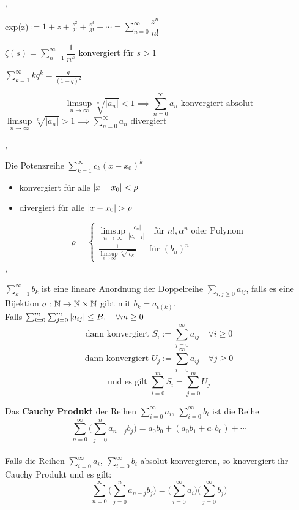 \sep

\Bsp exp(z)$ := 1 + z + \frac{z^2}{2!} + \frac{z^3}{3!} + \cdots = \sum_{n=0}^{\infty} \dfrac{z^{n}}{n!}$

\Bsp $\zeta(s) =  \sum_{n=1}^{\infty} \dfrac{1}{n^s}$ konvergiert für $s > 1$

\Bsp $\sum_{k=1}^{\infty} k q^k = \frac{q}{(1- q)^2}$ 

\Satz[Wurzelkriterium] 
\[\limsup\limits_{n \rightarrow \infty} \sqrt[n]{\left|a_{n}\right|}<1 \implies \sum_{n=0}^{\infty} a_{n} \text{ konvergiert absolut} \]
\(\limsup\limits_{n \rightarrow \infty} \sqrt[n]{\left|a_{n}\right|}>1 \implies \sum_{n=0}^{\infty} a_{n} \text{ divergiert}\)

\sep

\Korollar[2.7.21] Die Potenzreihe $\sum_{k=1}^{\infty} c_{k} (x-x_0)^k$
\begin{itemize}
\item konvergiert für alle $\left\lvert x - x_0 \right\rvert < \rho$ 
\item divergiert für alle $\left\lvert x - x_0 \right\rvert > \rho$
\end{itemize}
\[\rho = \begin{cases}
\limsup\limits_{n \rightarrow \infty} \frac{\left|c_{n}\right|}{\left|c_{n + 1}\right|} \quad \text{für } n!, \alpha^n \text{ oder Polynom} \\
\frac{1}{\limsup\limits_{c \rightarrow \infty} \sqrt[k]{\left|c_{k}\right|}}  \quad \  \ \text{für } (b_n)^n
\end{cases}\]
\sep

\Def[2.7.22] $\sum_{k=1}^{\infty} b_{k}$ ist eine lineare Anordnung der Doppelreihe $\sum_{i,j \geq 0} a_{ij}$, falls es eine Bijektion $\sigma : \mathbb{N} \rightarrow \mathbb{N} \times \mathbb{N}$ gibt mit $b_k = a_{\epsilon(k)}$.  \\

\Satz[2.7.23] Falls $\sum_{i=0}^{m}\sum_{j=0}^{m}\left\lvert a_{ij} \right\rvert \leq B, \quad \forall m \geq 0$
\[ \text{dann konvergiert } S_{i} := \sum_{j=0}^{\infty} a_{ij} \quad \forall i \geq 0 \]
\[ \text{dann konvergiert } U_{j} := \sum_{i=0}^{\infty} a_{ij} \quad \forall j \geq 0 \]
\[ \text{und es gilt } \sum_{i=0}^{m} S_{i} = \sum_{j=0}^{m} U_{j} \] 

\Satz[2.7.24] Das \textbf{Cauchy Produkt} der Reihen $\sum_{i=0}^{\infty} a_i, \ \sum_{i=0}^{\infty} b_i$ ist die Reihe
\[\sum_{n=0}^\infty \Bigg(\sum_{j=0}^{n} a_{n-j} b_{j} \Bigg) = a_0 b_0 + (a_0 b_1 + a_1 b_0) + \cdots  \]  \\

\Satz[2.7.26] Falls die Reihen $\sum_{i=0}^{\infty} a_i, \ \sum_{i=0}^{\infty} b_i$ absolut konvergieren, so knovergiert ihr Cauchy Produkt und es gilt:
\[\sum_{n=0}^\infty \Bigg(\sum_{j=0}^{n} a_{n-j} b_{j} \Bigg) = \Bigg( \sum_{i=0}^\infty a_i \Bigg) \Bigg(\sum_{j=0}^\infty b_j \Bigg) \]

